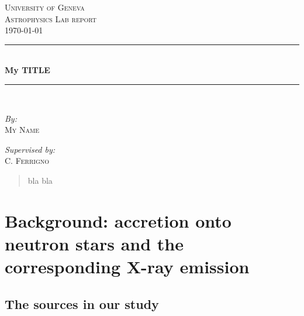 \documentclass[a4paper]{article}
\begin{document}
    \begin{titlepage}

    \newcommand{\HRule}{\rule{\linewidth}{0.8mm}}
    \center

    \textsc{\LARGE University of Geneva}\\[1.5cm]
    \textsc{\Large Astrophysics Lab report}\\[0.9cm]
    \textsc{\Large \today}\\[1.5cm]

    \HRule \\[0.4cm]
        {\LARGE \textsf{{\textbf{ My TITLE}}}}\\[0.4cm]
    \HRule \\[1.5cm]


    \begin{minipage}{1.0\textwidth}
       \begin{flushleft} \large
          \emph{By:}\\
          \textsc{My Name}
          \hfill
       \end{flushleft}
    \end{minipage}

    \begin{minipage}{1.0\textwidth}
        \begin{flushright} \large
            \emph{Supervised by:}\\
                C. \textsc{Ferrigno}
                \hfill
        \end{flushright}
    \end{minipage}


\newpage
\setcounter{page}{1}
    \begin{abstract}
\noindent bla bla
    \end{abstract}



  \end{titlepage}

\newpage
\setcounter{page}{2}
\tableofcontents

\newpage
\section{Background: accretion onto neutron stars and the corresponding X-ray emission}

  \subsection{The sources in our study}
\end{document}
